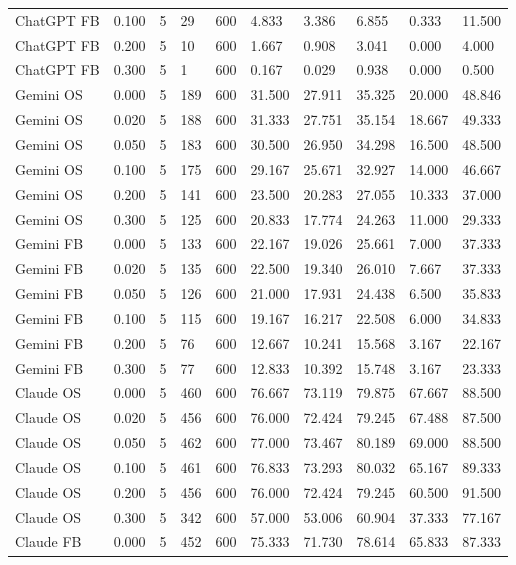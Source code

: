 \begin{tabular}{llllllllll}
ChatGPT FB & 0.100 & 5 & 29 & 600 & 4.833 & 3.386 & 6.855 & 0.333 & 11.500 \\
ChatGPT FB & 0.200 & 5 & 10 & 600 & 1.667 & 0.908 & 3.041 & 0.000 & 4.000 \\
ChatGPT FB & 0.300 & 5 & 1 & 600 & 0.167 & 0.029 & 0.938 & 0.000 & 0.500 \\
Gemini OS & 0.000 & 5 & 189 & 600 & 31.500 & 27.911 & 35.325 & 20.000 & 48.846 \\
Gemini OS & 0.020 & 5 & 188 & 600 & 31.333 & 27.751 & 35.154 & 18.667 & 49.333 \\
Gemini OS & 0.050 & 5 & 183 & 600 & 30.500 & 26.950 & 34.298 & 16.500 & 48.500 \\
Gemini OS & 0.100 & 5 & 175 & 600 & 29.167 & 25.671 & 32.927 & 14.000 & 46.667 \\
Gemini OS & 0.200 & 5 & 141 & 600 & 23.500 & 20.283 & 27.055 & 10.333 & 37.000 \\
Gemini OS & 0.300 & 5 & 125 & 600 & 20.833 & 17.774 & 24.263 & 11.000 & 29.333 \\
Gemini FB & 0.000 & 5 & 133 & 600 & 22.167 & 19.026 & 25.661 & 7.000 & 37.333 \\
Gemini FB & 0.020 & 5 & 135 & 600 & 22.500 & 19.340 & 26.010 & 7.667 & 37.333 \\
Gemini FB & 0.050 & 5 & 126 & 600 & 21.000 & 17.931 & 24.438 & 6.500 & 35.833 \\
Gemini FB & 0.100 & 5 & 115 & 600 & 19.167 & 16.217 & 22.508 & 6.000 & 34.833 \\
Gemini FB & 0.200 & 5 & 76 & 600 & 12.667 & 10.241 & 15.568 & 3.167 & 22.167 \\
Gemini FB & 0.300 & 5 & 77 & 600 & 12.833 & 10.392 & 15.748 & 3.167 & 23.333 \\
Claude OS & 0.000 & 5 & 460 & 600 & 76.667 & 73.119 & 79.875 & 67.667 & 88.500 \\
Claude OS & 0.020 & 5 & 456 & 600 & 76.000 & 72.424 & 79.245 & 67.488 & 87.500 \\
Claude OS & 0.050 & 5 & 462 & 600 & 77.000 & 73.467 & 80.189 & 69.000 & 88.500 \\
Claude OS & 0.100 & 5 & 461 & 600 & 76.833 & 73.293 & 80.032 & 65.167 & 89.333 \\
Claude OS & 0.200 & 5 & 456 & 600 & 76.000 & 72.424 & 79.245 & 60.500 & 91.500 \\
Claude OS & 0.300 & 5 & 342 & 600 & 57.000 & 53.006 & 60.904 & 37.333 & 77.167 \\
Claude FB & 0.000 & 5 & 452 & 600 & 75.333 & 71.730 & 78.614 & 65.833 & 87.333 \\

\end{tabular}
